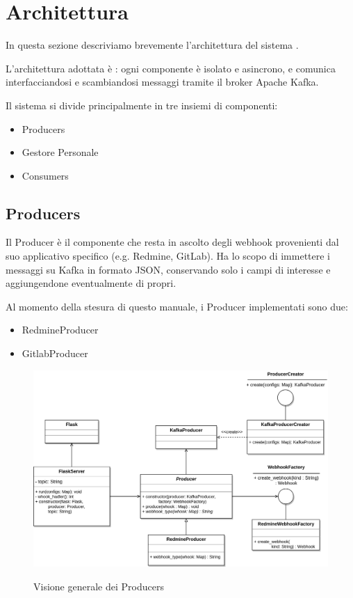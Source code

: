\section{Architettura}

In questa sezione descriviamo brevemente l'architettura del sistema \progetto.

L'architettura adottata è : ogni componente è isolato e asincrono,
e comunica interfacciandosi e scambiandosi messaggi tramite il broker Apache Kafka.

Il sistema si divide principalmente in tre insiemi di componenti:

\begin{itemize}
    \item Producers
    \item Gestore Personale
    \item Consumers
\end{itemize}

\subsection{Producers}
Il Producer è il componente che resta in ascolto degli webhook provenienti dal suo applicativo specifico (e.g. Redmine, GitLab).
Ha lo scopo di immettere i messaggi su Kafka in formato JSON, conservando solo i campi di interesse e aggiungendone eventualmente di propri.

Al momento della stesura di questo manuale, i Producer implementati sono due:
\begin{itemize}
    \item RedmineProducer
    \item GitlabProducer
\end{itemize}

\begin{figure}[H]
    \centering
    \includegraphics[width=\textwidth]{img/Producers.png}\\
    \caption{Visione generale dei Producers}
    \label{fig:producers}
\end{figure}


